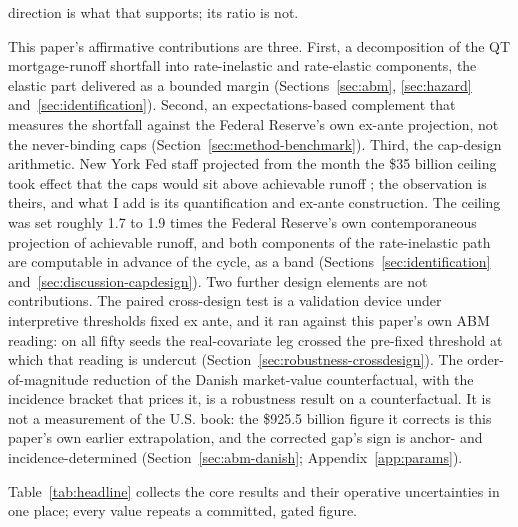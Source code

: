\documentclass[12pt]{article}
\begin{document}
direction is what that supports; its ratio is not.

This paper's affirmative contributions are three. First, a decomposition of the QT mortgage-runoff shortfall into rate-inelastic and rate-elastic components, the elastic part delivered as a bounded margin (Sections~\ref{sec:abm}, \ref{sec:hazard} and~\ref{sec:identification}). Second, an expectations-based complement that measures the shortfall against the Federal Reserve's own ex-ante projection, not the never-binding caps (Section~\ref{sec:method-benchmark}). Third, the cap-design arithmetic. New York Fed staff projected from the month the \$35 billion ceiling took effect that the caps would sit above achievable runoff \citep{nyfed2022}; the observation is theirs, and what I add is its quantification and ex-ante construction. The ceiling was set roughly 1.7 to 1.9 times the Federal Reserve's own contemporaneous projection of achievable runoff, and both components of the rate-inelastic path are computable in advance of the cycle, as a band (Sections~\ref{sec:identification} and~\ref{sec:discussion-capdesign}). Two further design elements are not contributions. The paired cross-design test is a validation device under interpretive thresholds fixed ex ante, and it ran against this paper's own ABM reading: on all fifty seeds the real-covariate leg crossed the pre-fixed threshold at which that reading is undercut (Section~\ref{sec:robustness-crossdesign}). The order-of-magnitude reduction of the Danish market-value counterfactual, with the incidence bracket that prices it, is a robustness result on a counterfactual. It is not a measurement of the U.S. book: the \$925.5 billion figure it corrects is this paper's own earlier extrapolation, and the corrected gap's sign is anchor- and incidence-determined (Section~\ref{sec:abm-danish}; Appendix~\ref{app:params}).

Table~\ref{tab:headline} collects the core results and their operative uncertainties in one place; every value repeats a committed, gated figure.
\end{document}

